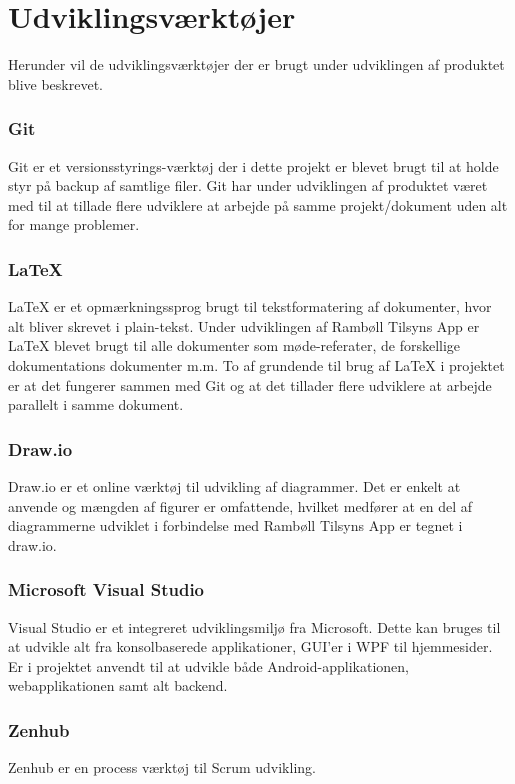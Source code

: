 \chapter{Udviklingsværktøjer}
Herunder vil de udviklingsværktøjer der er brugt under udviklingen af 
produktet blive beskrevet.

\subsection*{Git}
Git\cite{GitRef} er et versionsstyrings-værktøj der i dette projekt er 
blevet brugt til at holde styr på backup af samtlige filer. Git har under 
udviklingen af produktet været med til at tillade flere udviklere at 
arbejde på samme projekt/dokument uden alt for mange problemer.

\subsection*{\LaTeX}
\LaTeX \cite{LatexRef} er et opmærkningssprog brugt til tekstformatering af 
dokumenter, hvor alt bliver skrevet i plain-tekst. Under udviklingen af 
Rambøll Tilsyns App er LaTeX blevet brugt til alle dokumenter som 
møde-referater, de forskellige dokumentations dokumenter m.m. To af grundende til brug af LaTeX i 
projektet er at det fungerer sammen med Git og at det tillader flere 
udviklere at arbejde parallelt i samme dokument.

\subsection*{Draw.io}
Draw.io\cite{Draw.io} er et online værktøj til udvikling af diagrammer. 
Det er enkelt at anvende og mængden af figurer er omfattende, hvilket medfører at en del af diagrammerne udviklet i forbindelse med Rambøll Tilsyns App er tegnet i draw.io.

\subsection*{Microsoft Visual Studio}
Visual Studio\cite{VisualStudio} er et integreret udviklingsmiljø fra 
Microsoft. Dette kan 	bruges til at udvikle alt fra konsolbaserede 
applikationer, GUI'er i WPF til hjemmesider. Er i projektet anvendt til at 
udvikle både Android-applikationen, webapplikationen samt alt backend.

\subsection*{Zenhub}
Zenhub \cite{Zenhub} er en process værktøj til Scrum udvikling.

